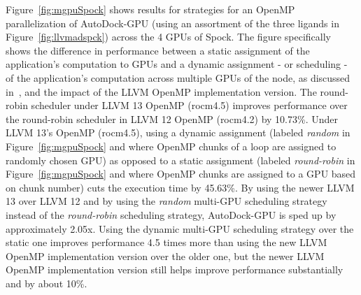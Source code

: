 Figure~\ref{fig:mgpuSpock} shows results for strategies for an OpenMP parallelization of AutoDock-GPU (using an assortment of the three ligands in Figure~\ref{fig:llvmadspck}) across the 4 GPUs of Spock. The figure specifically shows the difference in performance between a static assignment of the application's computation to GPUs and a dynamic assignment - or scheduling - of the application's computation across multiple GPUs of the node, as discussed in~\cite{9669317}, and the impact of the LLVM OpenMP implementation version. The round-robin scheduler under LLVM 13 OpenMP (rocm4.5) improves performance over the round-robin scheduler in LLVM 12 OpenMP (rocm4.2) by 10.73\%. Under LLVM 13’s OpenMP (rocm4.5), using a dynamic assignment (labeled \textit{random} in Figure~\ref{fig:mgpuSpock} and where OpenMP chunks of a loop are assigned to randomly chosen GPU) as opposed to a static assignment (labeled \textit{round-robin} in Figure~\ref{fig:mgpuSpock} and where OpenMP chunks are assigned to a GPU based on chunk number) cuts the execution time by 45.63\%. By using the newer LLVM 13 over LLVM 12 and by using the \textit{random} multi-GPU scheduling strategy instead of the \textit{round-robin} scheduling strategy, AutoDock-GPU is sped up by approximately 2.05x. Using the dynamic multi-GPU scheduling strategy over the static one improves performance 4.5 times more than using the new LLVM OpenMP implementation version over the older one, but the newer LLVM OpenMP implementation version still helps improve performance substantially and by about 10\%. 